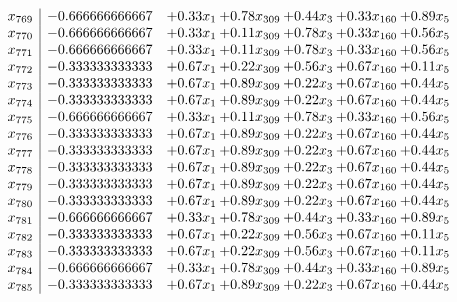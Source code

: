 \documentclass[8pt]{article}
\begin{document}
\[\begin{array}{c| c c@{\hskip 2pt} c@{\hskip 2pt} c@{\hskip 2pt} c@{\hskip 2pt} c@{\hskip 2pt} }
 x_{769}   &  -0.666666666667 & +  0.33 x_{1} & +  0.78 x_{309} & +  0.44 x_{3} & +  0.33 x_{160} & +  0.89 x_{5}\\
 x_{770}   &  -0.666666666667 & +  0.33 x_{1} & +  0.11 x_{309} & +  0.78 x_{3} & +  0.33 x_{160} & +  0.56 x_{5}\\
 x_{771}   &  -0.666666666667 & +  0.33 x_{1} & +  0.11 x_{309} & +  0.78 x_{3} & +  0.33 x_{160} & +  0.56 x_{5}\\
 x_{772}   &  -0.333333333333 & +  0.67 x_{1} & +  0.22 x_{309} & +  0.56 x_{3} & +  0.67 x_{160} & +  0.11 x_{5}\\
 x_{773}   &  -0.333333333333 & +  0.67 x_{1} & +  0.89 x_{309} & +  0.22 x_{3} & +  0.67 x_{160} & +  0.44 x_{5}\\
 x_{774}   &  -0.333333333333 & +  0.67 x_{1} & +  0.89 x_{309} & +  0.22 x_{3} & +  0.67 x_{160} & +  0.44 x_{5}\\
 x_{775}   &  -0.666666666667 & +  0.33 x_{1} & +  0.11 x_{309} & +  0.78 x_{3} & +  0.33 x_{160} & +  0.56 x_{5}\\
 x_{776}   &  -0.333333333333 & +  0.67 x_{1} & +  0.89 x_{309} & +  0.22 x_{3} & +  0.67 x_{160} & +  0.44 x_{5}\\
 x_{777}   &  -0.333333333333 & +  0.67 x_{1} & +  0.89 x_{309} & +  0.22 x_{3} & +  0.67 x_{160} & +  0.44 x_{5}\\
 x_{778}   &  -0.333333333333 & +  0.67 x_{1} & +  0.89 x_{309} & +  0.22 x_{3} & +  0.67 x_{160} & +  0.44 x_{5}\\
 x_{779}   &  -0.333333333333 & +  0.67 x_{1} & +  0.89 x_{309} & +  0.22 x_{3} & +  0.67 x_{160} & +  0.44 x_{5}\\
 x_{780}   &  -0.333333333333 & +  0.67 x_{1} & +  0.89 x_{309} & +  0.22 x_{3} & +  0.67 x_{160} & +  0.44 x_{5}\\
 x_{781}   &  -0.666666666667 & +  0.33 x_{1} & +  0.78 x_{309} & +  0.44 x_{3} & +  0.33 x_{160} & +  0.89 x_{5}\\
 x_{782}   &  -0.333333333333 & +  0.67 x_{1} & +  0.22 x_{309} & +  0.56 x_{3} & +  0.67 x_{160} & +  0.11 x_{5}\\
 x_{783}   &  -0.333333333333 & +  0.67 x_{1} & +  0.22 x_{309} & +  0.56 x_{3} & +  0.67 x_{160} & +  0.11 x_{5}\\
 x_{784}   &  -0.666666666667 & +  0.33 x_{1} & +  0.78 x_{309} & +  0.44 x_{3} & +  0.33 x_{160} & +  0.89 x_{5}\\
 x_{785}   &  -0.333333333333 & +  0.67 x_{1} & +  0.89 x_{309} & +  0.22 x_{3} & +  0.67 x_{160} & +  0.44 x_{5}\\

\end{array}\]
\end{document}
